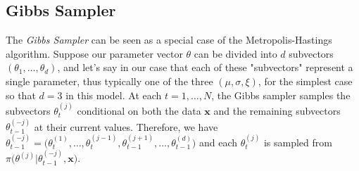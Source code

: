 \subsection{Gibbs Sampler}

The \emph{Gibbs Sampler} can be seen as a special case of the Metropolis-Hastings algorithm.
Suppose our parameter vector $\theta$ can be divided into $d$ subvectors $(\theta_1,\dots,\theta_d)$, and let's say in our case that each of these "subvectors" represent a single parameter, thus typically one of the three $(\mu,\sigma,\xi)$, for the simplest case so that $d=3$ in this model.
At each $t=1,\dots,N$, the Gibbs sampler samples the subvectors $\theta_t^{(j)}$ conditional on both the data $\boldsymbol{x}$ and the remaining subvectors $\theta_{t-1}^{(-j)}$ at their current values.
Therefore, we have $\theta_{t-1}^{(-j)}=\Big(\theta_t^{(1)},\dots,\theta_t^{(j-1)},\theta_{t-1}^{(j+1)},\dots,\theta_{t-1}^{(d)}\Big)$ and each $\theta_t^{(j)}$ is sampled from $\pi\Big(\theta^{(j)}|\theta_{t-1}^{(-j)},\boldsymbol{x}\Big)$. \\

